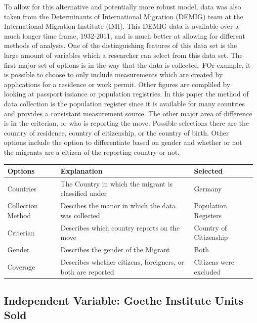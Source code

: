 \documentclass[]{article}
\begin{document}
To allow for this alternative and potentially more robust model, data
was also taken from the Determinants of International Migration (DEMIG)
team at the International Migration Institute (IMI). This DEMIG data is
available over a much longer time frame, 1932-2011, and is much better
at allowing for different methods of analysis. One of the distinguishing
features of this data set is the large amount of variables which a
researcher can select from this data set. The first major set of options
is in the way that the data is collected. FOr example, it is possible to
choose to only include measurements which are created by applications
for a residence or work permit. Other figures are compliled by looking
at passport issiance or population registries. In this paper the method
of data collection is the population register since it is available for
many countries and provides a consistant measurement source. The other
major area of difference is in the criterian, or who is reporting the
move. Possible selections there are the country of residence, country of
citizenship, or the country of birth. Other options include the option
to differentiate based on gender and whether or not the migrants are a
citizen of the reporting country or not.

\begin{longtable}[]{@{}lll@{}}
\toprule
Options & Explanation & Selected\tabularnewline
\midrule
\endhead
Countries & The Country in which the migrant is classified under &
Germany\tabularnewline
Collection Method & Descibes the manor in which the data was collected &
Population Registers\tabularnewline
Criterian & Describes which country reports on the move & Country of
Citizenship\tabularnewline
Gender & Describes the gender of the Migrant & Both\tabularnewline
Coverage & Describes whether citizens, foreigners, or both are reported
& Citizens were excluded\tabularnewline
\bottomrule
\end{longtable}

\subsection{Independent Variable: Goethe Institute Units
Sold}\label{independent-variable-goethe-institute-units-sold}
\end{document}
